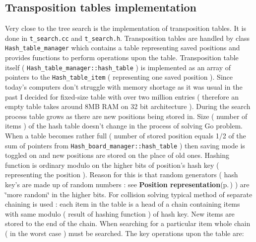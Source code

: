 \subsection{Transposition tables implementation}\label{page_3_page__1_section_2}
Very close to the tree search is the implementation of transposition tables. It is done in {\tt t\_\-search.cc} and {\tt t\_\-search.h}. Transposition tables are handled by class {\tt Hash\_\-table\_\-manager} which contains a table representing saved positions and provides functions to perform operations upon the table. Transposition table itself ( {\tt Hash\_\-table\_\-manager::hash\_\-table} ) is implemented as an array of pointers to the {\tt Hash\_\-table\_\-item} ( representing one saved position ). Since today's computers don't struggle with memory shortage as it was usual in the past I decided for fixed-size table with over two million entries ( therefore an empty table takes around 8MB RAM on 32 bit architecture ). During the search process table grows as there are new positions being stored in. Size ( number of items ) of the hash table doesn't change in the process of solving Go problem. When a table becomes rather full ( number of stored position equals 1/2 of the sum of pointers from {\tt Hash\_\-board\_\-manager::hash\_\-table} ) then saving mode is toggled on and new positions are stored on the place of old ones. Hashing function is ordinary modulo on the higher bits of position's hash key ( representing the position ). Reason for this is that random generators ( hash key's are made up of random numbers : see {\bf Position representation}{\rm (p.\,\pageref{page_6})} ) are \char`\"{}more random\char`\"{} in the higher bits. For collision solving typical method of separate chaining is used : each item in the table is a head of a chain containing items with same modulo ( result of hashing function ) of hash key. New items are stored to the end of the chain. When searching for a particular item whole chain ( in the worst case ) must be searched. The key operations upon the table are:

